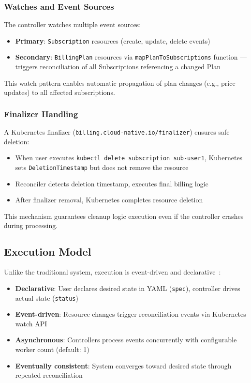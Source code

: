 \subsubsection{Watches and Event Sources}

The controller watches multiple event sources:

\begin{itemize}
    \item \textbf{Primary}: \texttt{Subscription} resources (create, update, delete events)
    \item \textbf{Secondary}: \texttt{BillingPlan} resources via \texttt{mapPlanToSubscriptions} function --- triggers reconciliation of all Subscriptions referencing a changed Plan
\end{itemize}

This watch pattern enables automatic propagation of plan changes (e.g., price updates) to all affected subscriptions.

\subsubsection{Finalizer Handling}

A Kubernetes finalizer (\texttt{billing.cloud-native.io/finalizer}) ensures safe deletion:

\begin{itemize}
    \item When user executes \texttt{kubectl delete subscription sub-user1}, Kubernetes sets \texttt{DeletionTimestamp} but does not remove the resource
    \item Reconciler detects deletion timestamp, executes final billing logic
    \item After finalizer removal, Kubernetes completes resource deletion
\end{itemize}

This mechanism guarantees cleanup logic execution even if the controller crashes during processing.

\subsection{Execution Model}

Unlike the traditional system, execution is event-driven and declarative~\cite{ibryam2020, kubernetes_declarative_automation}:

\begin{itemize}
    \item \textbf{Declarative}: User declares desired state in YAML (\texttt{spec}), controller drives actual state (\texttt{status})
    \item \textbf{Event-driven}: Resource changes trigger reconciliation events via Kubernetes watch API
    \item \textbf{Asynchronous}: Controllers process events concurrently with configurable worker count (default: 1)
    \item \textbf{Eventually consistent}: System converges toward desired state through repeated reconciliation
\end{itemize}

